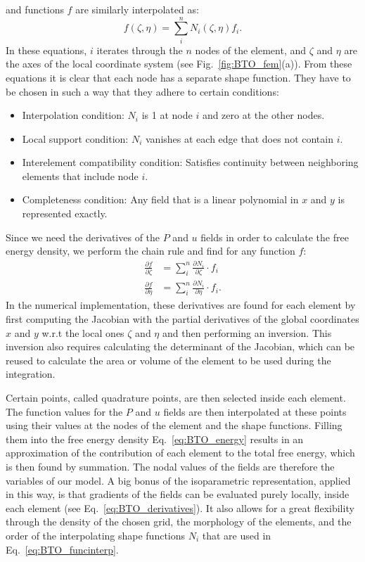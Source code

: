 and functions $f$ are similarly interpolated as:
\begin{equation}
	\label{eq:BTO_funcinterp}
	f(\zeta, \eta) = \sum_i^n N_i(\zeta, \eta) f_i.
\end{equation}
In these equations, $i$ iterates through the $n$ nodes of the element, and $\zeta$ and $\eta$ are the axes of the local coordinate system (see Fig.~\ref{fig:BTO_fem}(a)).
From these equations it is clear that each node has a separate shape function.
They have to be chosen in such a way that they adhere to certain conditions:
\begin{itemize}
	\item Interpolation condition: $N_i$ is 1 at node $i$ and zero at the other nodes.
	\item Local support condition: $N_i$ vanishes at each edge that does not contain $i$.
	\item Interelement compatibility condition: Satisfies continuity between neighboring elements that include node $i$.
	\item Completeness condition: Any field that is a linear polynomial in $x$ and $y$ is represented exactly.
\end{itemize}

Since we need the derivatives of the $P$ and $u$ fields in order to calculate the free energy density, we perform the chain rule and find for any function $f$:
\begin{align}
	\label{eq:BTO_derivatives}
	\frac{\partial f}{\partial \zeta} &= \sum_i^n \frac{\partial N_i}{\partial \zeta} \cdot f_i \\
	\frac{\partial f}{\partial \eta}  &= \sum_i^n \frac{\partial N_i}{\partial \eta} \cdot f_i\nonumber.
\end{align}
In the numerical implementation, these derivatives are found for each element by first computing the Jacobian with the partial derivatives of the global coordinates $x$ and $y$ w.r.t the local ones $\zeta$ and $\eta$ and then performing an inversion.
This inversion also requires calculating the determinant of the Jacobian, which can be reused to calculate the area or volume of the element to be used during the integration.

Certain points, called quadrature points, are then selected inside each element.
The function values for the $P$ and $u$ fields are then interpolated at these points using their values at the nodes of the element and the shape functions.
Filling them into the free energy density Eq.~\eqref{eq:BTO_energy} results in an approximation of the contribution of each element to the total free energy, which is then found by summation. 
The nodal values of the fields are therefore the variables of our model. 
A big bonus of the isoparametric representation, applied in this way, is that gradients of the fields can be evaluated purely locally, inside each element (see Eq.~\eqref{eq:BTO_derivatives}).
It also allows for a great flexibility through the density of the chosen grid, the morphology of the elements, and the order of the interpolating shape functions $N_i$ that are used in Eq.~\eqref{eq:BTO_funcinterp}.

